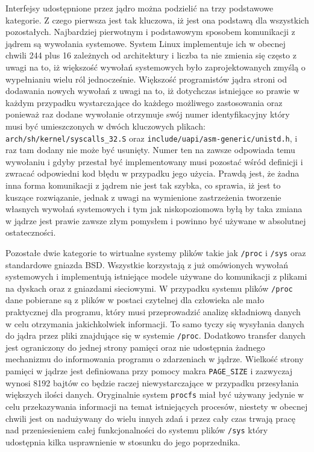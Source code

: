 \documentclass[10pt]{article}
\begin{document}
Interfejsy udostępnione przez jądro można podzielić na trzy podstawowe kategorie. Z czego pierwsza jest tak kluczowa, iż jest ona podstawą dla wszystkich pozostałych. Najbardziej pierwotnym i podstawowym sposobem komunikacji z jądrem są wywołania systemowe. System Linux implementuje ich w obecnej chwili 244 plus 16 zależnych od architektury i liczba ta nie zmienia się często z uwagi na to, iż większość wywołań systemowych było zaprojektowanych zmyślą o wypełnianiu wielu ról jednocześnie.  Większość programistów jądra stroni od dodawania nowych wywołań z uwagi na to, iż dotychczas istniejące so prawie w każdym przypadku wystarczające do każdego możliwego zastosowania oraz ponieważ raz dodane wywołanie otrzymuje swój numer identyfikacyjny który musi być umieszczonych w dwóch kluczowych plikach: \texttt{arch/sh/kernel/syscalls\_32.S} oraz \texttt{include/uapi/asm-generic/unistd.h}, i raz tam dodany nie może być usunięty. Numer ten na zawsze odpowiada temu wywołaniu i gdyby przestał być implementowany musi pozostać wśród definicji i zwracać odpowiedni kod błędu w przypadku jego użycia. Prawdą jest, że żadna inna forma komunikacji z jądrem nie jest tak szybka, co sprawia, iż jest to kuszące rozwiązanie, jednak z uwagi na wymienione zastrzeżenia tworzenie własnych wywołań systemowych i tym jak niskopoziomowa byłą by taka zmiana w jądrze jest prawie zawsze złym pomysłem i powinno być używane w absolutnej ostateczności.

Pozostałe dwie kategorie to wirtualne systemy plików takie jak \texttt{/proc} i \texttt{/sys} oraz standardowe gniazda BSD\@. Wszystkie korzystają z już omówionych wywołań systemowych i implementują istniejące modele używane do komunikacji z plikami na dyskach oraz z gniazdami sieciowymi. W przypadku systemu plików \texttt{/proc} dane pobierane są z plików w postaci czytelnej dla człowieka ale mało praktycznej dla programu, który musi przeprowadzić analizę składniową danych w celu otrzymania jakichkolwiek informacji. To samo tyczy się wysyłania danych do jądra przez pliki znajdujące się w systemie \texttt{/proc}. Dodatkowo transfer danych jest ograniczony do jednej strony pamięci oraz nie udostępnia żadnego mechanizmu do informowania programu o zdarzeniach w jądrze. Wielkość strony pamięci w jądrze jest definiowana przy pomocy makra \texttt{PAGE\_SIZE} i zazwyczaj wynosi 8192 bajtów co będzie raczej niewystarczające w przypadku przesyłania większych ilości danych. Oryginalnie system \texttt{procfs} miał być używany jedynie w celu przekazywania informacji na temat istniejących procesów, niestety w obecnej chwili jest on nadużywany do wielu innych zdań i przez cały czas trwają pracę nad przeniesieniem całej funkcjonalności do systemu plików \texttt{/sys} który udostępnia kilka usprawnienie w stosunku do jego poprzednika.
\end{document}
